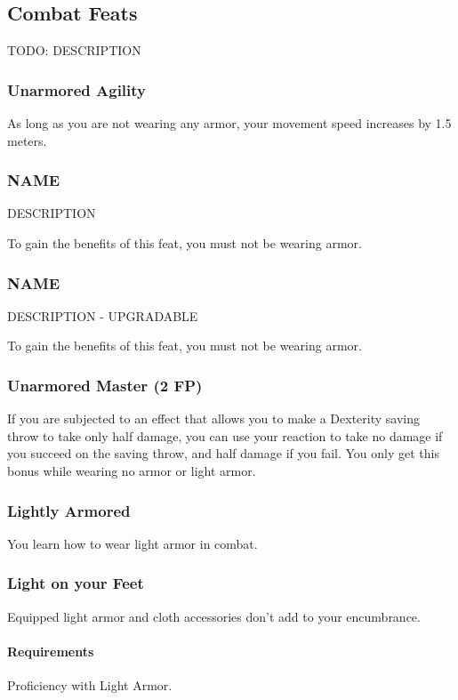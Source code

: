 \subsection*{Combat Feats}
TODO: DESCRIPTION

\subsubsection{Unarmored Agility} \label{feat::unarmoredagility}
    As long as you are not wearing any armor, your movement speed increases by 1.5 meters.
\subsubsection{NAME} \label{feat::name}
    DESCRIPTION

    To gain the benefits of this feat, you must not be wearing armor.
\subsubsection{NAME} \label{feat::name}
    DESCRIPTION - UPGRADABLE

    To gain the benefits of this feat, you must not be wearing armor.
\subsubsection{Unarmored Master (2 FP)} \label{feat::unarmoredfighter}
    If you are subjected to an effect that allows you to make a Dexterity saving throw to take only half damage, you can use your reaction to take no damage if you succeed on the saving throw, and half damage if you fail.
    You only get this bonus while wearing no armor or light armor.
\subsubsection{Lightly Armored} \label{feat::lightlyarmored}
    You learn how to wear light armor in combat.
\subsubsection{Light on your Feet} \label{feat::lightonyourfeet}
    Equipped light armor and cloth accessories don't add to your encumbrance.
    \paragraph{Requirements} Proficiency with Light Armor.
